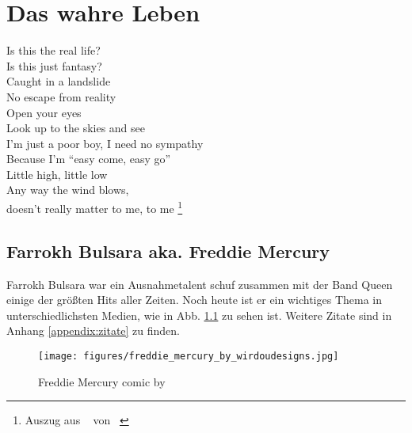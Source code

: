 \chapter{Das wahre Leben}
\label{chap:real-life}
\begin{center}
Is this the real life? \\
Is this just fantasy? \\
Caught in a landslide \\
No escape from reality \\
Open your eyes \\
Look up to the skies and see \\
I'm just a poor boy, I need no sympathy \\
Because I'm \enquote{easy come, easy go} \\
Little high, little low \\
Any way the wind blows, \\
doesn't really matter to me, 
to me \footnote{Auszug aus ~\cite{BohemRhap} von \citeauthor{Queen}~\cite{Queen} }\\
\end{center}
        \tagmcend
\tagstructend
\section{Farrokh Bulsara aka. Freddie Mercury}
Farrokh Bulsara war ein Ausnahmetalent schuf zusammen mit der Band Queen einige der größten Hits aller Zeiten. Noch heute ist er ein wichtiges Thema in unterschiedlichsten Medien, wie in Abb. \ref{fig:freddiehg} zu sehen ist. Weitere Zitate sind in Anhang \ref{appendix:zitate} zu finden.
        \tagmcend
\tagstructend
\begin{figure}
\begin{center} \texttt{[image: figures/freddie\_mercury\_by\_wirdoudesigns.jpg]} \end{center}
\caption{Freddie Mercury comic by~\citeauthor{wirdou}~\cite{wirdou}}
\label{fig:freddiehg}
\end{figure}

\newpage
